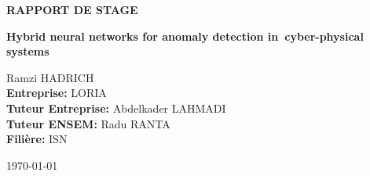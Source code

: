 \pagestyle{empty}
\begin{center}


{\large \textbf{RAPPORT DE STAGE}}
\vspace{8cm}

{\fontsize{18}{18}\selectfont \textbf{Hybrid neural networks for anomaly detection in~cyber-physical systems}}
\end{center}
\normalsize


\vspace{8cm}
\noindent Ramzi HADRICH \\
\textbf{Entreprise:} LORIA\\
\textbf{Tuteur Entreprise:} Abdelkader LAHMADI\\
\textbf{Tuteur ENSEM:} Radu RANTA\\
\textbf{Filière:} ISN\\
\begin{center}
    \today
\end{center}

